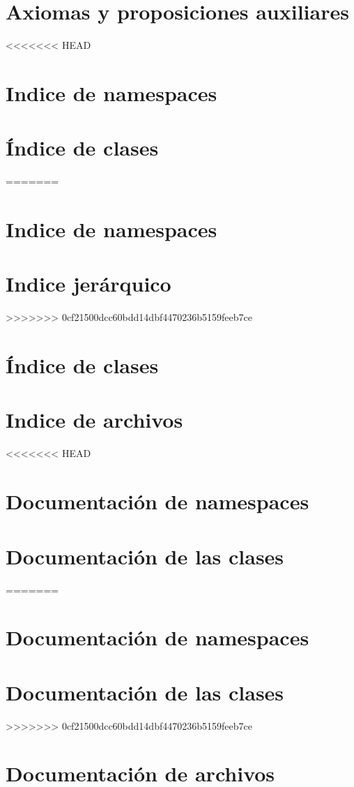\documentclass[twoside]{article}
\newcommand{\+}{\discretionary{\mbox{\scriptsize$\hookleftarrow$}}{}{}}
\newcommand{\clearemptydoublepage}{%
  \newpage{\pagestyle{empty}\cleardoublepage}%
}
\begin{document}
\section{Axiomas y proposiciones auxiliares}
\label{axiomas}

<<<<<<< HEAD
\section{\-Indice de namespaces}

\section{Índice de clases}
=======
\section{Indice de namespaces}

\section{Indice jerárquico}
>>>>>>> 0cf21500dcc60bdd14dbf4470236b5159feeb7ce

\section{Índice de clases}

\section{Indice de archivos}

<<<<<<< HEAD
\section{\-Documentación de namespaces}

\section{\-Documentación de las clases}
=======
\section{Documentación de namespaces}

\section{Documentación de las clases}
>>>>>>> 0cf21500dcc60bdd14dbf4470236b5159feeb7ce






\section{Documentación de archivos}



\newpage
{}



\newpage
{}
\clearemptydoublepage
{}
\printindex
\end{document}
